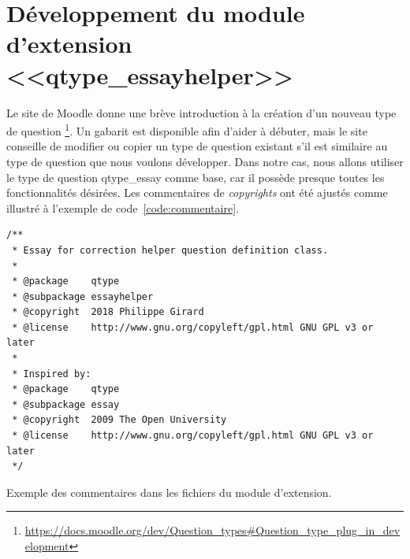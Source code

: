 \chapter{D\'eveloppement du module d'extension <<qtype\_essayhelper>>}
Le site de Moodle donne une br\`eve introduction \`a la cr\'eation d'un nouveau type de question \footnote{\url{https://docs.moodle.org/dev/Question\_types\#Question\_type\_plug\_in\_development}}.
Un gabarit est disponible afin d'aider \`a d\'ebuter, mais le site conseille de modifier ou copier un type de question existant s'il est similaire au type de question que nous voulons d\'evelopper.
Dans notre cas, nous allons utiliser le type de question \og qtype\_essay \fg{} comme base, car il poss\`ede presque toutes les fonctionnalit\'es d\'esir\'ees.
Les commentaires de \emph{copyrights} ont \'et\'e ajust\'es comme illustr\'e \`a l'exemple de code~\ref{code:commentaire}.
\begin{lstfloat}
\begin{lstlisting}[frame=l]
/**
 * Essay for correction helper question definition class.
 *
 * @package    qtype
 * @subpackage essayhelper
 * @copyright  2018 Philippe Girard
 * @license    http://www.gnu.org/copyleft/gpl.html GNU GPL v3 or later
 *
 * Inspired by:
 * @package    qtype
 * @subpackage essay
 * @copyright  2009 The Open University
 * @license    http://www.gnu.org/copyleft/gpl.html GNU GPL v3 or later
 */
\end{lstlisting}
\caption{Exemple des commentaires dans les fichiers du module d'extension.}
\label{code:commentaire}
\end{lstfloat}
